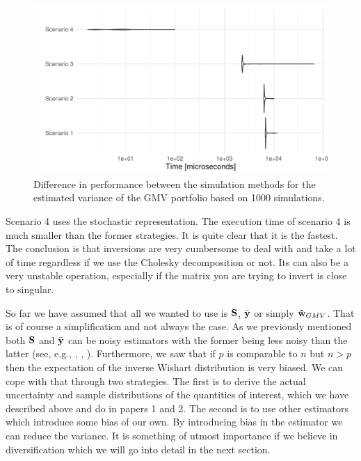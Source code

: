 \documentclass[oneside]{book}\usepackage{knitr}
\begin{document}
\begin{knitrout}\small
{}\color{fgcolor}\begin{figure}

{\centering \includegraphics[width=\maxwidth]{figure/microbenchmark_output-1} 

}

\caption[Difference in performance between the simulation methods for the estimated variance of the GMV portfolio based on 1000 simulations]{Difference in performance between the simulation methods for the estimated variance of the GMV portfolio based on 1000 simulations.}\label{fig:microbenchmark_output}
\end{figure}

\end{knitrout}

Scenario 4 uses the stochastic representation. 
The execution time of scenario 4 is much smaller than the former strategies.
It is quite clear that it is the fastest. 
The conclusion is that inversions are very cumbersome to deal with and take a lot of time regardless if we use the Cholesky decomposition or not.
Its can also be a very unstable operation, especially if the matrix you are trying to invert is close to singular.

So far we have assumed that all we wanted to use is $\mathbf{S}$, $\bar{\mathbf{y}}$ or simply $\mathbf{\hat{w}}_{GMV}$.
That is of course a simplification and not always the case.
As we previously mentioned both $\mathbf{S}$ and $\bar{\mathbf{y}}$ can be noisy estimators with the former being less noisy than the latter (see, e.g., \citet{frankfurter1971portfolio}, \citet{merton1980estimating}, \citet{best1991sensitivity}). 
Furthermore, we saw that if $p$ is comparable to $n$ but $n>p$ then the expectation of the inverse Wishart distribution is very biased.
We can cope with that through two strategies. 
The first is to derive the actual uncertainty and sample distributions of the quantities of interest, which we have described above and do in papers 1 and 2.
The second is to use other estimators which introduce some bias of our own.
By introducing bias in the estimator we can reduce the variance.
It is something of utmost importance if we believe in diversification which we will go into detail in the next section.
\end{document}
